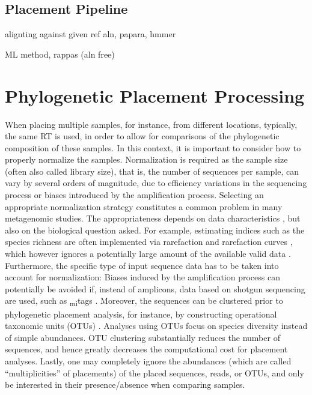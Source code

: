 \subsection{Placement Pipeline}
\label{ch:Foundations:sec:PhylogeneticPlacement:sub:PlacementPipeline}


alignting against given ref aln, papara, hmmer

ML method, rappas (aln free)



\section{Phylogenetic Placement Processing}
\label{ch:Foundations:sec:PhylogeneticPlacementProcessing}

When placing multiple samples, for instance, from different locations,
typically, the same \ac{RT} is used, in order to allow for comparisons of the phylogenetic composition of these samples.
In this context, it is important to consider how to properly normalize the samples.
Normalization is required as the sample size (often also called library size),
that is, the number of sequences per sample, can vary by several orders of magnitude,
due to efficiency variations in the sequencing process or biases introduced by the amplification process.
Selecting an appropriate normalization strategy constitutes a common problem in many metagenomic studies.
The appropriateness depends on data characteristics \cite{Weiss2017}, but also on the biological question asked.
For example, estimating indices such as the species richness are often implemented
via rarefaction and rarefaction curves \cite{Gotelli2001},
which however ignores a potentially large amount of the available valid data \cite{McMurdie2014}.
Furthermore, the specific type of input sequence data has to be taken into account for normalization:
Biases induced by the amplification process can potentially be avoided if, instead of amplicons,
data based on shotgun sequencing are used, such as \textsubscript{mi}tags \cite{Logares2014}.
Moreover, the sequences can be clustered prior to phylogenetic placement analysis,
for instance, by constructing operational taxonomic units (OTUs) \cite{Edgar2010,Mahe2014,Mahe2015,Rognes2016}.
Analyses using OTUs focus on species diversity instead of simple abundances.
OTU clustering substantially reduces the number of sequences,
and hence greatly decreases the computational cost for placement analyses.
Lastly, one may completely ignore the abundances (which are called ``multiplicities'' of placements) of the placed
sequences, reads, or OTUs, and only be interested in their presence/absence when comparing samples.


